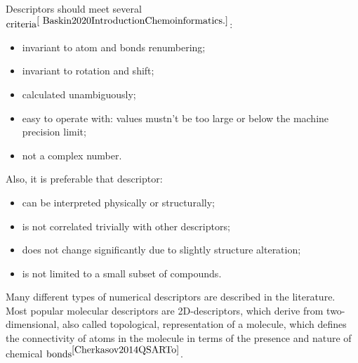 \noindent Descriptors should meet several $\text{criteria}^{\cite{
Baskin2020IntroductionChemoinformatics.}}$:
\begin{itemize}
    \item invariant to atom and bonds renumbering;
    \item invariant to rotation and shift;
    \item calculated unambiguously;
    \item easy to operate with: values mustn't be too large or below the machine precision limit;
    \item not a complex number.
\end{itemize}
\hfill\break
Also, it is preferable that descriptor:
\begin{itemize}
    \item can be interpreted physically or structurally;
    \item is not correlated trivially with other descriptors;
    \item does not change significantly due to slightly structure alteration;
    \item is not limited to a small subset of compounds.
\end{itemize}

\noindent Many different types of numerical descriptors are described in the literature. 
Most popular molecular descriptors are 2D-descriptors, which derive from two-dimensional, also called topological, representation of a molecule, which defines the connectivity of atoms in the molecule in terms of the presence and nature of chemical $\text{bonds}^{\cite{Cherkasov2014QSARTo}}$. 

